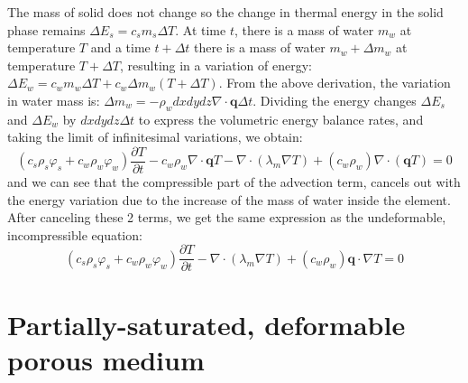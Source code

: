 \documentclass[letterpaper,12pt,oneside]{report}
\begin{document}
The mass of solid does not change so the change in thermal energy in the solid phase remains $\Delta E_s = c_s m_s \Delta T$. At time $t$, there is a mass of water $m_w$ at temperature $T$ and a time $t+\Delta t$ there is a mass of water $m_w + \Delta m_w$ at temperature $T+\Delta T$, resulting in a variation of energy: $\Delta E_w = c_w m_w \Delta T + c_w \Delta m_w (T+\Delta T)$. From the above derivation, the variation in water mass is: $\Delta m_w = -\rho_w dx dy dz \nabla \cdot \bm{q} \Delta t$.
Dividing the energy changes $\Delta E_s$ and $\Delta E_w$ by $dx dy dz \Delta t$ to express the volumetric energy balance rates, and taking the limit of infinitesimal variations, we obtain:
\begin{equation}
(c_s \rho_s \varphi_s + c_w \rho_w \varphi_w) \frac{\partial T}{\partial t} - c_w \rho_w \nabla \cdot \bm{q}T - \nabla \cdot (\lambda_m \nabla T) + (c_w \rho_w) \nabla \cdot (\bm{q}T) = 0
\end{equation}
and we can see that the compressible part of the advection term, cancels out with the energy variation due to the increase of the mass of water inside the element. After canceling these 2 terms, we get the same expression as the undeformable, incompressible equation:
\begin{equation}
(c_s \rho_s \varphi_s + c_w \rho_w \varphi_w) \frac{\partial T}{\partial t} - \nabla \cdot (\lambda_m \nabla T) + (c_w \rho_w) \bm{q} \cdot \nabla T = 0
\end{equation}



\section{Partially-saturated, deformable porous medium}
\end{document}
